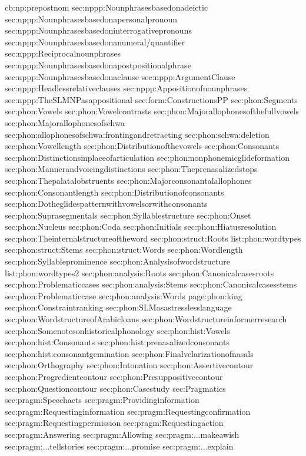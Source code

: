 {cb:np:prepostnom}
{sec:nppp:Nounphrasesbasedonadeictic}
{sec:nppp:Nounphrasesbasedonapersonalpronoun}
{sec:nppp:Nounphrasesbasedoninterrogativepronouns}
{sec:nppp:Nounphrasesbasedonanumeral/quantifier}
{sec:nppp:Reciprocalnounphrases}
{sec:nppp:Nounphrasesbasedonapostpositionalphrase}
{sec:nppp:Nounphrasesbasedonaclause}
{sec:nppp:ArgumentClause}
{sec:nppp:Headlessrelativeclauses}
{sec:nppp:Appositionofnounphrases}
{sec:nppp:TheSLMNPasappositional}
{sec:form:ConstructionsPP}
{sec:phon:Segments}
{sec:phon:Vowels}
{sec:phon:Vowelcontrasts}
{sec:phon:Majorallophonesofthefullvowels}
{sec:phon:Majorallophonesofschwa}
{sec:phon:allophonesofschwa:frontingandretracting}
{sec:phon:schwa:deletion}
{sec:phon:Vowellength}
{sec:phon:Distributionofthevowels}
{sec:phon:Consonants}
{sec:phon:Distinctionsinplaceofarticulation}
{sec:phon:nonphonemicglideformation}
{sec:phon:Mannerandvoicingdistinctions}
{sec:phon:Theprenasalizedstops}
{sec:phon:Thepalatalobstruents}
{sec:phon:Majorconsonantalallophones}
{sec:phon:Consonantlength}
{sec:phon:Distributionofconsonants}
{sec:phon:Dotheglidespatternwithvowelsorwithconsonants}
{sec:phon:Suprasegmentals}
{sec:phon:Syllablestructure}
{sec:phon:Onset}
{sec:phon:Nucleus}
{sec:phon:Coda}
{sec:phon:Initials}
{sec:phon:Hiatusresolution}
{sec:phon:Theinternalstructureoftheword}
{sec:phon:struct:Roots}
{list:phon:wordtypes}
{sec:phon:struct:Stems}
{sec:phon:struct:Words}
{sec:phon:Wordlength}
{sec:phon:Syllableprominence}
{sec:phon:Analysisofwordstructure}
{list:phon:wordtypes2}
{sec:phon:analysis:Roots}
{sec:phon:Canonicalcasesroots}
{sec:phon:Problematiccases}
{sec:phon:analysis:Stems}
{sec:phon:Canonicalcasesstems}
{sec:phon:Problematiccase}
{sec:phon:analysis:Words}
{page:phon:king}
{sec:phon:Constraintranking}
{sec:phon:SLMasastresslesslanguage}
{sec:phon:WordstructureofArabicloans}
{sec:phon:Wordstructureinformerresearch}
{sec:phon:Somenotesonhistoricalphonology}
{sec:phon:hist:Vowels}
{sec:phon:hist:Consonants}
{sec:phon:hist:prenasalizedconsonants}
{sec:phon:hist:consonantgemination}
{sec:phon:Finalvelarizationofnasals}
{sec:phon:Orthography}
{sec:phon:Intonation}
{sec:phon:Assertivecontour}
{sec:phon:Progredientcontour}
{sec:phon:Presuppositivecontour}
{sec:phon:Questioncontour}
{sec:phon:Casestudy}
{sec:Pragmatics}
{sec:pragm:Speechacts}
{sec:pragm:Providinginformation}
{sec:pragm:Requestinginformation}
{sec:pragm:Requestingconfirmation}
{sec:pragm:Requestingpermission}
{sec:pragm:Requestingaction}
{sec:pragm:Answering}
{sec:pragm:Allowing}
{sec:pragm:...makeawish}
{sec:pragm:...tellstories}
{sec:pragm:...promise}
{sec:pragm:...explain}
